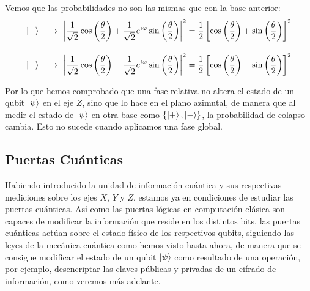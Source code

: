 \documentclass{article}
\numberwithin{equation}{section} %
\begin{document}
    \vspace{2.5mm}

    Vemos que las probabilidades no son las mismas que con la base anterior:
    \begin{align*}
        \ket{+} \ &\longrightarrow \ \left| \frac{1}{\sqrt{2}} \cos \left( \frac{\theta}{2} \right) + \frac{1}{\sqrt{2}} e^{i \varphi} \sin \left( \frac{\theta}{2} \right) \right| ^ {2} = \frac{1}{2} \left[ \cos \left( \frac{\theta}{2} \right) + \sin \left( \frac{\theta}{2} \right)\right] ^ {2} \\[10pt]
        \ket{-} \ &\longrightarrow \ \left| \frac{1}{\sqrt{2}} \cos \left( \frac{\theta}{2} \right) - \frac{1}{\sqrt{2}} e^{i \varphi} \sin \left( \frac{\theta}{2} \right) \right| ^ {2} = \frac{1}{2} \left[ \cos \left( \frac{\theta}{2} \right) - \sin \left( \frac{\theta}{2} \right)\right] ^ {2}
    \end{align*}

    \vspace{5mm}

    Por lo que hemos comprobado que una fase relativa no altera el estado de un qubit \( \ket{\psi} \) en el eje \( Z \), sino que lo hace en el plano azimutal, de manera que al medir el estado de \( \ket{\psi} \) en otra base como \( \{ \ket{+}, \ket{-} \} \), la probabilidad de colapso cambia. Esto no sucede cuando aplicamos una fase global.

    \vspace{10mm}


    


    \subsection{Puertas Cuánticas}\label{sec: puertas_cuanticas}

    \vspace{5mm}

    Habiendo introducido la unidad de información cuántica y sus respectivas mediciones sobre los ejes \( X \), \( Y \) y \( Z \), estamos ya en condiciones de estudiar las puertas cuánticas. Así como las puertas lógicas en computación clásica son capaces de modificar la información que reside en los distintos bits, las puertas cuánticas actúan sobre el estado físico de los respectivos qubits, siguiendo las leyes de la mecánica cuántica como hemos visto hasta ahora, de manera que se consigue modificar el estado de un qubit \( \ket{\psi} \) como resultado de una operación, por ejemplo, desencriptar las claves públicas y privadas de un cifrado de información, como veremos más adelante.
    
\end{document}
